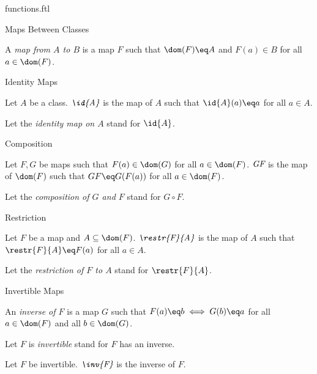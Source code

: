 \documentclass{naproche-library}
\begin{document}
\begin{smodule}[title=Functions and Maps]{functions.ftl}
\begin{sfragment}{Maps Between Classes}
  \begin{definition}[forthel,id=MapFromToDef]
    A \emph{map from $A$ to $B$} is a map $F$ such that $\dom(F)\eq A$ and $F(a)\in B$ for all $a\in\dom(F)$.
  \end{definition}
\end{sfragment}

\begin{sfragment}{Identity Maps}
  \begin{definition}[forthel,id=IdentityMapDef]
    Let $A$ be a class.
    $\emph{\id{A}}$ is the map of $A$ such that $\id{A}(a)\eq a$ for all $a\in A$.

    Let the \emph{identity map on $A$} stand for $\id{A}$.
  \end{definition}
\end{sfragment}

\begin{sfragment}{Composition}
  \begin{definition}[forthel,id=CompositionDef]
    Let $F,G$ be maps such that $F(a)\in\dom(G)$ for all $a\in\dom(F)$.
    $\emph{G\circ F}$ is the map of $\dom(F)$ such that $G\circ F\eq G(F(a))$ for all $a\in\dom(F)$.

    Let the \emph{composition of $G$ and $F$} stand for $G\circ F$.
  \end{definition}
\end{sfragment}

\begin{sfragment}{Restriction}
  \begin{definition}[forthel,id=RestrictionDef]
    Let $F$ be a map and $A\subseteq\dom(F)$.
    $\emph{\restr{F}{A}}$ is the map of $A$ such that $\restr{F}{A}\eq F(a)$ for all $a\in A$.

    Let the \emph{restriction of $F$ to $A$} stand for $\restr{F}{A}$.
  \end{definition}
\end{sfragment}

\begin{sfragment}{Invertible Maps}
  \begin{definition}[forthel,id=InvertibleDef]
    An \emph{inverse of $F$} is a map $G$ such that $F(a)\eq b\iff G(b)\eq a$ for all $a\in\dom(F)$ and all $b\in\dom(G)$.

    Let $F$ is \emph{invertible} stand for $F$ has an inverse.
  \end{definition}

  \begin{definition}[forthel,id=InverseMapDef]
    Let $F$ be invertible.
    $\emph{\inv{F}}$ is the inverse of $F$.
  \end{definition}
\end{sfragment}


\end{smodule}
\end{document}
